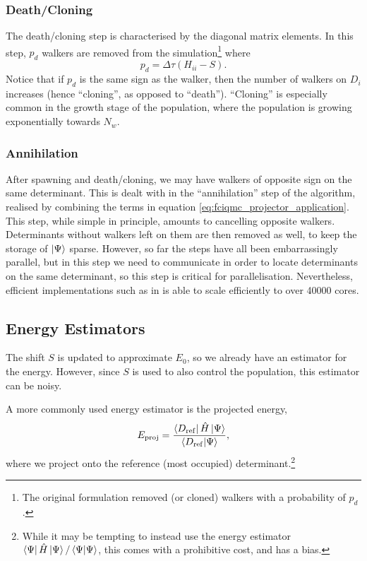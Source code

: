 \subsubsection{Death/Cloning}

The death/cloning step is characterised by the diagonal matrix elements. In this step, $p_d$ walkers are removed from the simulation\footnote{The original formulation removed (or cloned) walkers with a probability of $p_d$.} where
\begin{equation}
    p_d = \Delta\tau(H_{ii}-S).
\end{equation}
Notice that if $p_d$ is the same sign as the walker, then the number of walkers on $D_i$ increases (hence ``cloning'', as opposed to ``death''). ``Cloning'' is especially common in the growth stage of the population, where the population is growing exponentially towards $N_w$.

\subsubsection{Annihilation}

After spawning and death/cloning, we may have walkers of opposite sign on the same determinant. This is dealt with in the ``annihilation'' step of the algorithm, realised by combining the terms in equation \ref{eq:fciqmc_projector_application}. This step, while simple in principle, amounts to cancelling opposite walkers. Determinants without walkers left on them are then removed as well, to keep the storage of $\ket\Psi$ sparse. However, so far the steps have all been embarrassingly parallel, but in this step we need to communicate in order to locate determinants on the same determinant, so this step is critical for parallelisation. Nevertheless, efficient implementations such as in \neci is able to scale efficiently to over 40000 cores.

\subsection{Energy Estimators}
\label{sec:fciqmc_energy_estimators}

The shift $S$ is updated to approximate $E_0$, so we already have an estimator for the energy. However, since $S$ is used to also control the population, this estimator can be noisy.

A more commonly used energy estimator is the projected energy,
\begin{equation}
    \label{eq:projected_energy}
    E_\mathrm{proj} = \frac{\bra{D_\mathrm{ref}}\hat H\ket{\Psi}}{\braket{D_\mathrm{ref}}{\Psi}},
\end{equation}
where we project onto the reference (most occupied) determinant.\footnote{While it may be tempting to instead use the energy estimator $\bra{\Psi}\hat H\ket{\Psi}/\braket{\Psi}{\Psi}$, this comes with a prohibitive cost, and has a bias.}

